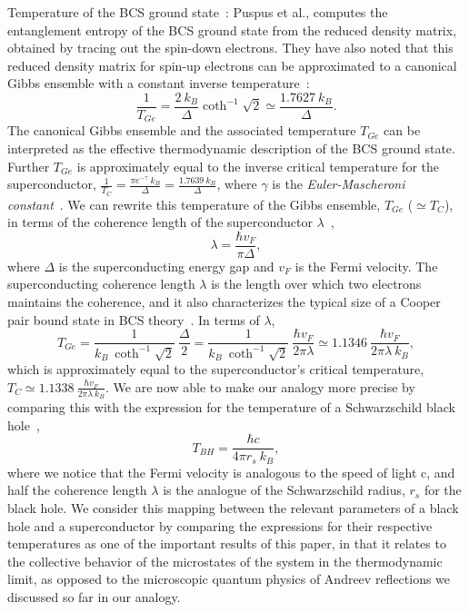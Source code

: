\documentclass[10pt,letterpaper,aps,onecolumn,superscriptaddress,floatfix,notitlepage]{revtex4-1}
\begin{document}
	Temperature of the BCS ground state~\cite{puspus2014entanglement}: Puspus et al., computes the entanglement entropy of the BCS ground state from the reduced density matrix, obtained by tracing out the spin-down electrons. They have also noted that this reduced density matrix for spin-up electrons can be approximated to a canonical Gibbs ensemble with a constant inverse temperature~\cite{puspus2014entanglement}:
	\begin{equation}
	\label{Tge}
	\frac{1}{T_{Ge}} =\frac{2~k_{B}}{\Delta}\coth^{-1}\sqrt{2}\simeq\frac{1.7627~k_{B}}{\Delta}.
	\end{equation}
	The canonical Gibbs ensemble and the associated temperature $T_{Ge}$ can be interpreted as the effective thermodynamic description of the BCS ground state. 
	Further $T_{Ge}$ is approximately equal to the inverse critical temperature for the superconductor, $\frac{1}{T_{C}} = \frac{\pi e^{-\gamma}~k_{B}}{\Delta} = \frac{1.7639~k_{B}}{\Delta}$, where $\gamma$ is the \textit{Euler-Mascheroni constant}~\cite{puspus2014entanglement}.  We can rewrite this temperature of the Gibbs ensemble, $T_{Ge}$ ($\simeq T_{C}$), in terms of the coherence length of the superconductor $\lambda$~\cite{annett2004superconductivity}, 
	\begin{equation}
	\lambda = \frac{\hbar v_{F}}{\pi\Delta},
	\end{equation}
	where $\Delta$ is the superconducting energy gap and $v_{F}$ is the Fermi velocity. The superconducting coherence length $\lambda$ is the length over which two electrons maintains the coherence, and it also characterizes the typical size of a Cooper pair bound state in BCS theory~\cite{annett2004superconductivity}. In terms of $\lambda$,   
	\begin{equation}
	T_{Ge} = \frac{1}{k_{B}~\coth^{-1}\sqrt{2}}~\frac{\Delta}{2} = \frac{1}{k_{B}~\coth^{-1}\sqrt{2}}~\frac{\hbar v_{F}}{2\pi\lambda}\simeq 1.1346~ \frac{\hbar v_{F}}{2\pi\lambda~k_{B}}, 
	\end{equation} which is approximately equal to the superconductor's critical temperature,
	$T_{C} \simeq 1.1338~ \frac{\hbar v_{F}}{2\pi\lambda~k_{B}}.$ We are now able to make our analogy more precise by comparing this with the expression for the temperature of a Schwarzschild black hole~\cite{temp,temp2,temp3}, 
	\begin{equation}\label{bhT}T_{BH} =\frac{\hbar c}{4\pi r_{s}~k_{B}},\end{equation}
	where we notice that the Fermi velocity is analogous to the speed of light c, and half the coherence length $\lambda$ is the analogue of the Schwarzschild radius, $r_{s}$ for the black hole. We consider this mapping between the relevant parameters of a black hole and a superconductor by comparing the expressions for their respective temperatures as one of the important results of this paper, in that it relates to the collective behavior of the microstates of the system in the thermodynamic limit, as opposed to  the microscopic quantum physics of Andreev reflections we discussed so far in our analogy.     
\end{document}
